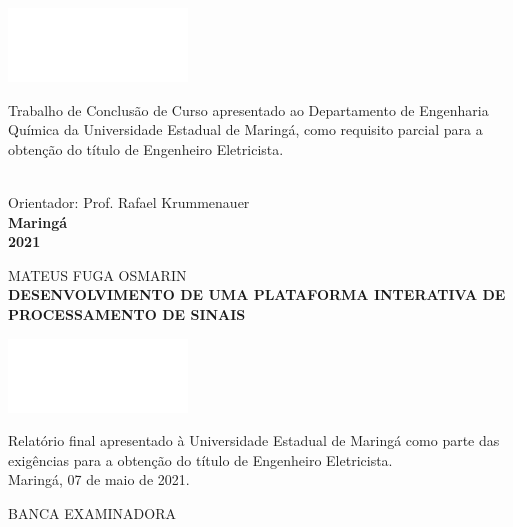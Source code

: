 \documentclass[12pt,a4paper]{report}
\begin{document}
\begin{minipage}{0.49\linewidth}
  \includegraphics[scale=0.01]{images/branco} 
\end{minipage}
\begin{minipage}{0.5\linewidth}
{
  \justifying 
  Trabalho de Conclusão de Curso apresentado ao Departamento de Engenharia Química da Universidade Estadual de
  Maringá, como requisito parcial para a obtenção do título de Engenheiro Eletricista.
}\\
\end{minipage}\\[2.978cm]

{
  \center
  Orientador: Prof. Rafael Krummenauer\\[2.978cm]

  {
    \bf
    Maringá\\
    2021
  }
}

\thispagestyle{empty}
\clearpage

\center

MATEUS FUGA OSMARIN\\[1.86cm]

\textbf{DESENVOLVIMENTO DE UMA PLATAFORMA INTERATIVA DE PROCESSAMENTO DE SINAIS}\\[1.86cm]


\begin{minipage}{0.49\linewidth}
\includegraphics[scale=0.01]{images/branco} 
\end{minipage}
\begin{minipage}{0.5\linewidth}
  {
    \justifying 
    Relatório final apresentado à Universidade Estadual de Maringá como parte das exigências para a obtenção do
    título de Engenheiro Eletricista.
  }\\[1.86cm]

  Maringá, 07 de maio de 2021.\\[1.86cm]
\end{minipage}

{
  \center BANCA EXAMINADORA\\[2.41cm]
}
\end{document}
